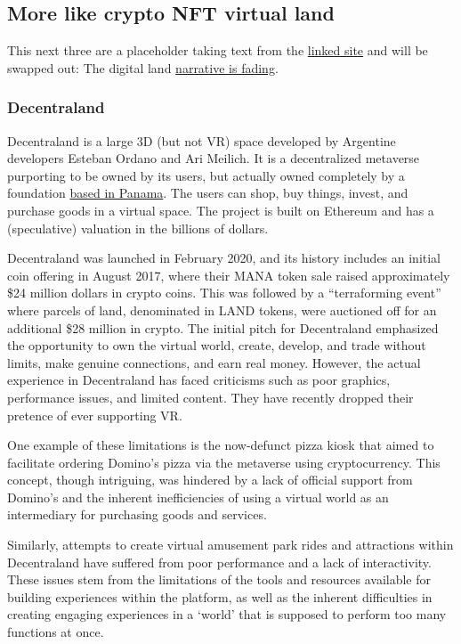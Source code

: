 \subsection{More like crypto NFT virtual land}
This next three are a placeholder taking text from the \href{https://www.analyticsinsight.net/top-10-metaverse-platforms-that-will-replace-social-media-in-future/}{linked site} and will be swapped out:
The digital land \href{https://www.coindesk.com/markets/2022/04/06/metaverse-majors-struggle-as-user-base-falls-short-of-market-expectations/?}{narrative is fading}.
\subsubsection{Decentraland}
Decentraland is a large 3D (but not VR) space developed by Argentine developers Esteban Ordano and Ari Meilich. It is a decentralized metaverse purporting to be owned by its users, but actually owned completely by a foundation \href{https://www.crunchbase.com/organization/decentraland/people}{based in Panama}. The users can shop, buy things, invest, and purchase goods in a virtual space. The project is built on Ethereum and has a (speculative) valuation in the billions of dollars.\par Decentraland was launched in February 2020, and its history includes an initial coin offering in August 2017, where their MANA token sale raised approximately \$24 million dollars in crypto coins. This was followed by a ``terraforming event'' where parcels of land, denominated in LAND tokens, were auctioned off for an additional \$28 million in crypto. The initial pitch for Decentraland emphasized the opportunity to own the virtual world, create, develop, and trade without limits, make genuine connections, and earn real money. However, the actual experience in Decentraland has faced criticisms such as poor graphics, performance issues, and limited content. They have recently dropped their pretence of ever supporting VR.\par 
One example of these limitations is the now-defunct pizza kiosk that aimed to facilitate ordering Domino's pizza via the metaverse using cryptocurrency. This concept, though intriguing, was hindered by a lack of official support from Domino's and the inherent inefficiencies of using a virtual world as an intermediary for purchasing goods and services.\par
Similarly, attempts to create virtual amusement park rides and attractions within Decentraland have suffered from poor performance and a lack of interactivity. These issues stem from the limitations of the tools and resources available for building experiences within the platform, as well as the inherent difficulties in creating engaging experiences in a `world' that is supposed to perform too many functions at once.\par 
